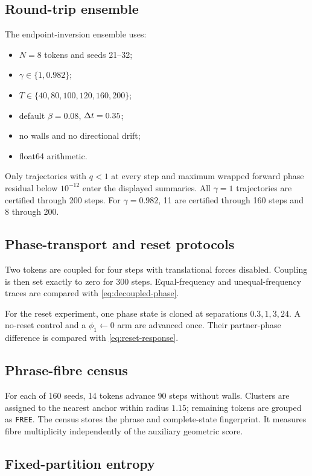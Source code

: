 \subsection{Round-trip ensemble}

The endpoint-inversion ensemble uses:
\begin{itemize}
\item \(N=8\) tokens and seeds 21--32;
\item \(\gamma\in\{1,0.982\}\);
\item \(T\in\{40,80,100,120,160,200\}\);
\item default \(\beta=0.08\), \(\Delta t=0.35\);
\item no walls and no directional drift;
\item float64 arithmetic.
\end{itemize}
Only trajectories with \(q<1\) at every step and maximum wrapped forward phase residual below \(10^{-12}\) enter the displayed summaries. All \(\gamma=1\) trajectories are certified through 200 steps. For \(\gamma=0.982\), 11 are certified through 160 steps and 8 through 200.

\subsection{Phase-transport and reset protocols}

Two tokens are coupled for four steps with translational forces disabled. Coupling is then set exactly to zero for 300 steps. Equal-frequency and unequal-frequency traces are compared with \cref{eq:decoupled-phase}.

For the reset experiment, one phase state is cloned at separations \(0.3,1,3,24\). A no-reset control and a \(\phi_1\leftarrow0\) arm are advanced once. Their partner-phase difference is compared with \cref{eq:reset-response}.

\subsection{Phrase-fibre census}

For each of 160 seeds, 14 tokens advance 90 steps without walls. Clusters are assigned to the nearest anchor within radius \(1.15\); remaining tokens are grouped as \texttt{FREE}. The census stores the phrase and complete-state fingerprint. It measures fibre multiplicity independently of the auxiliary geometric score.

\subsection{Fixed-partition entropy}

